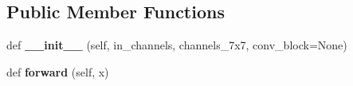 \subsection*{Public Member Functions}
\begin{DoxyCompactItemize}
\item 
\mbox{\label{classtorchvision_1_1models_1_1inception_1_1InceptionC_a9b62e2af3f37e30dfec80ade077d19fe}} 
def {\bfseries \+\_\+\+\_\+init\+\_\+\+\_\+} (self, in\+\_\+channels, channels\+\_\+7x7, conv\+\_\+block=None)
\item 
\mbox{\label{classtorchvision_1_1models_1_1inception_1_1InceptionC_a55e3011c4b38847ad375a540f8098347}} 
def {\bfseries forward} (self, x)
\end{DoxyCompactItemize}
